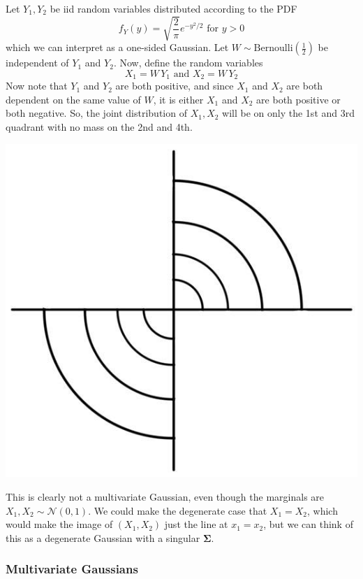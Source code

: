 \documentclass{article}
\begin{document}
  \begin{example}
  Let $Y_1, Y_2$ be iid random variables distributed according to the PDF 
  \[f_Y (y) = \sqrt{\frac{2}{\pi}} e^{-y^2 / 2} \text{ for } y > 0\]
  which we can interpret as a one-sided Gaussian. Let $W \sim \mathrm{Bernoulli}(\frac{1}{2})$ be independent of $Y_1$ and $Y_2$. Now, define the random variables 
  \[X_1 = W \, Y_1 \text{ and } X_2 = W \, Y_2\]
  Now note that $Y_1$ and $Y_2$ are both positive, and since $X_1$ and $X_2$ are both dependent on the same value of $W$, it is either $X_1$ and $X_2$ are both positive or both negative. So, the joint distribution of $X_1, X_2$ will be on only the 1st and 3rd quadrant with no mass on the 2nd and 4th. 
  \begin{center}
      \includegraphics[scale=0.23]{img/not_multi_Gaussian.jpg}
  \end{center}
  This is clearly not a multivariate Gaussian, even though the marginals are $X_1, X_2 \sim \mathcal{N}(0, 1)$. We could make the degenerate case that $X_1 = X_2$, which would make the image of $(X_1, X_2)$ just the line at $x_1 = x_2$, but we can think of this as a degenerate Gaussian with a singular $\boldsymbol{\Sigma}$. 
  \end{example}

  \subsubsection{Multivariate Gaussians}
\end{document}
